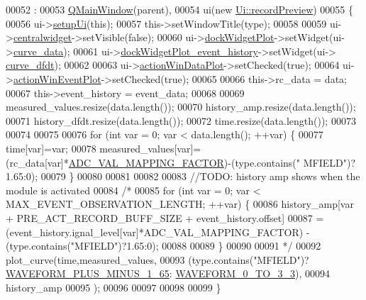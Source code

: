 \begin{DoxyCode}
00052                                                                                                         :
00053     \hyperlink{a00058}{QMainWindow}(parent),
00054     ui(\textcolor{keyword}{new} \hyperlink{a00074}{Ui::recordPreview})
00055 \{
00056     ui->\hyperlink{a00081_afa41dc070a896a5eae476f3c0206825c}{setupUi}(\textcolor{keyword}{this});
00057     this->setWindowTitle(type);
00058 
00059     ui->\hyperlink{a00081_ac9ab4609922159e8e4cc45905f76928e}{centralwidget}->setVisible(\textcolor{keyword}{false});
00060     ui->\hyperlink{a00081_a07b76f17803ec09e0367b72938bbd097}{dockWidgetPlot}->setWidget(ui->\hyperlink{a00081_a247d94481323c0bc4f8b6458a8a535dd}{curve\_data});
00061     ui->\hyperlink{a00081_a2a8f7ee8d4458dd20481c8a1c29ce185}{dockWidgetPlot\_event\_history}->setWidget(ui->
      \hyperlink{a00081_a43d24fa14d90cc27b310542e39dcdd1b}{curve\_dfdt});
00062 
00063     ui->\hyperlink{a00081_aa09067a9c96c9cd78f75261a9fcb89f0}{actionWinDataPlot}->setChecked(\textcolor{keyword}{true});
00064     ui->\hyperlink{a00081_ac72ec9c8679d46fd43a87f99ee6db893}{actionWinEventPlot}->setChecked(\textcolor{keyword}{true});
00065 
00066     this->rc\_data       = data;
00067     this->event\_history  = event\_data;
00068 
00069     measured\_values.resize(data.length());
00070     history\_amp.resize(data.length());
00071     history\_dfdt.resize(data.length());
00072     time.resize(data.length());
00073 
00074 
00075 
00076     \textcolor{keywordflow}{for} (\textcolor{keywordtype}{int} var = 0; var < data.length(); ++var) \{
00077         time[var]=var;
00078         measured\_values[var]=(rc\_data[var]*\hyperlink{a00086_ada92d3eeeec0cbeee41e76a52d145792}{ADC\_VAL\_MAPPING\_FACTOR})-(type.contains(\textcolor{stringliteral}{"
      MFIELD"})?1.65:0);
00079     \}
00080 
00081 
00082 
00083     \textcolor{comment}{//TODO: history amp shows when the module is activated}
00084     \textcolor{comment}{/*}
00085 \textcolor{comment}{    for (int var = 0; var < MAX\_EVENT\_OBSERVATION\_LENGTH; ++var) \{}
00086 \textcolor{comment}{        history\_amp[var + PRE\_ACT\_RECORD\_BUFF\_SIZE + event\_history.offset]}
00087 \textcolor{comment}{                =(event\_history.ignal\_level[var]*ADC\_VAL\_MAPPING\_FACTOR) -
       (type.contains("MFIELD")?1.65:0);}
00088 \textcolor{comment}{}
00089 \textcolor{comment}{    \}}
00090 \textcolor{comment}{}
00091 \textcolor{comment}{    */}
00092     plot\_curve(time,measured\_values,
00093               (type.contains(\textcolor{stringliteral}{"MFIELD"})?\hyperlink{a00090_a0923d3b365a36e1e8c401cec964aa36f}{WAVEFORM\_PLUS\_MINUS\_1\_65}:
      \hyperlink{a00090_ae18fed2471b16a8516d721ff60671dd9}{WAVEFORM\_0\_TO\_3\_3}),
00094               history\_amp
00095               );
00096 
00097 
00098 
00099 \}
\end{DoxyCode}


